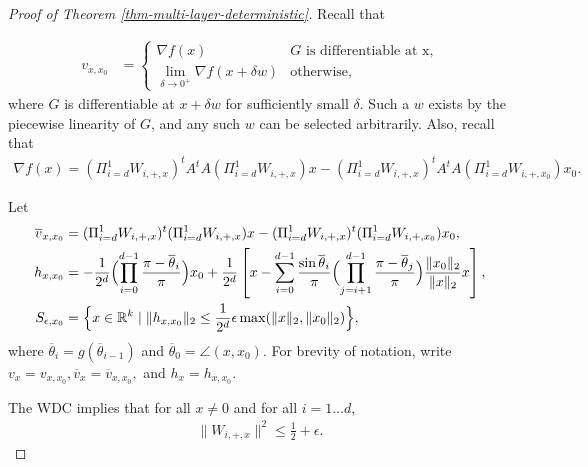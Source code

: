 \documentclass[11pt]{article}
\newcommand{\R}{\mathbb{R}}
\newcommand{\eps}{\epsilon}
\newcommand{\thetabar}{\overline{\theta}}
\newcommand{\tran}{t}
\newcommand{\red}[1]{{\color{black} #1}}
\newcommand{\xo}{x_0}
\newcommand{\AtA}{A^\tran A}
\newcommand{\hxxo}{h_{x, \xo}}
\newcommand{\PiWd}{\Pi_{i=d}^1 W_{i,+,x}}
\newcommand{\PiWdo}{\Pi_{i=d}^1 W_{i,+,\xo}}
\newcommand{\Wipx}{W_{i, +, x}}
\newcommand{\vx}{v_{x}}
\newcommand{\vbarx}{\overline{v}_{x}}
\newcommand{\vxxo}{v_{x, \xo}}
\newcommand{\vbarxxo}{\overline{v}_{x, \xo}}
\newcommand{\hx}{h_x}
\begin{document}
\begin{proof}[Proof of Theorem \ref{thm-multi-layer-deterministic}]
Recall that

\begin{align*}
\vxxo &= \begin{cases}\nabla f(x) & G \text{ is differentiable at x,}\\ \lim_{\delta \to 0^+} \nabla f(x + \delta w) & \text{otherwise,} \end{cases} \end{align*}
where $G$ is differentiable at $x+\delta w$ for sufficiently small $\delta$.  Such a $w$ exists by the piecewise linearity of $G$, and any such $w$ can be selected arbitrarily.  Also, recall that
\begin{align*}
 \nabla f(x) = (\PiWd)^t \AtA (\PiWd) x -  (\PiWd)^t \AtA (\PiWdo) \xo.
\end{align*}

Let
\begin{align*}
\vbarxxo &= (\PiWd)^t  (\PiWd) x -  (\PiWd)^t (\PiWdo) \xo,\\
\hxxo %
&=  - \frac{1}{2^d} \Bigl( \prod_{i=0}^{d-1} \frac{\pi - \thetabar_i}{\pi}  \Bigr)\xo 
+ \frac{1}{2^d} \left[ x - \sum_{i=0}^{d-1} \frac{\sin \thetabar_i}{\pi}  \Bigl( \prod_{j=i+1}^{d-1} \frac{\pi - \thetabar_j}{\pi}  \Bigr)  \frac{\|\xo\|_2}{\|x\|_2} x  \right], \\
S_{\eps, \xo} &= \Bigl \{ x \in \R^k \mid \| \hxxo \|_2 \leq \frac{1}{2^d} \eps \max(\|x\|_2, \|\xo\|_2 ) \Bigr \},
\end{align*}
where $\thetabar_i = g(\thetabar_{i-1})$ and $\thetabar_0 = \angle(x, \xo)$. 
For brevity of notation, write $\vx = \vxxo, \vbarx = \vbarxxo,$ and $\hx = \hxxo$.  

The WDC implies that  for all $x \neq 0$ and for all $i = 1 \ldots d$, 
\begin{align}
\| \Wipx\|^2 \leq \frac{1}{2} + \eps. \label{bound-Wiplusx-squared}
\end{align}


\end{proof}
\end{document}
